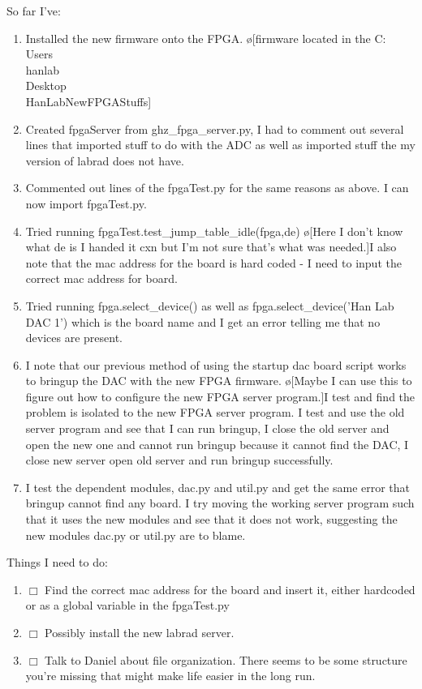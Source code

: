\documentclass[10pt]{book}
\begin{document}
{So far I've:
\begin{enumerate}
    \item Installed the new firmware onto the FPGA. \o[firmware located in the C:\\Users\\hanlab\\Desktop\\HanLabNewFPGAStuffs]{}
    \item Created fpgaServer from ghz\_fpga\_server.py, I had to comment out several lines that imported stuff to do with the ADC as well as imported stuff the my version of labrad does not have.
    \item Commented out lines of the fpgaTest.py for the same reasons as above. I can now import fpgaTest.py.
    \item Tried running fpgaTest.test\_jump\_table\_idle(fpga,de) \o[Here I don't know what de is I handed it cxn but I'm not sure that's what was needed.]{I also note that the mac address for the board is hard coded - I need to input the correct mac address for board.}
    \item Tried running fpga.select\_device() as well as fpga.select\_device('Han Lab DAC 1') which is the board name and I get an error telling me that no devices are present.
    \item I note that our previous method of using the startup dac board script works to bringup the DAC with the new FPGA firmware. \o[Maybe I can use this to figure out how to configure the new FPGA server program.]{I test and find the problem is isolated to the new FPGA server program. I test and use the old server program and see that I can run bringup, I close the old server and open the new one and cannot run bringup because it cannot find the DAC, I close new server open old server and run bringup successfully.}
    \item I test the dependent modules, dac.py and util.py and get the same error that bringup cannot find any board. I try moving the working server program such that it uses the new modules and see that it does not work, suggesting the new modules dac.py or util.py are to blame.
\end{enumerate}


Things I need to do:
\begin{enumerate}
    \item $\Box$ Find the correct mac address for the board and insert it, either hardcoded or as a global variable in the fpgaTest.py
    \item $\Box$ Possibly install the new labrad server.
    \item $\Box$ Talk to Daniel about file organization. There seems to be some structure you're missing that might make life easier in the long run.
      

\end{enumerate}}
\end{document}
